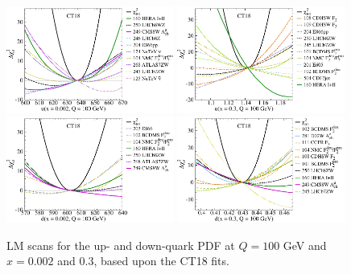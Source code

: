 \begin{figure}[p]
	\includegraphics[width=0.49\textwidth]{./fig/pib23hTnu2E-3p0_0E00_LM27-__1_x2_00E-03_Q1_00E+02_DEchi2_re0_ect.pdf} 
	\includegraphics[width=0.49\textwidth]{./fig/pib23hTnu3E-1p1_0E1_LM27-__1_x3_00E-01_Q1_00E+02_DEchi2_re0_ect.pdf}\\
	\includegraphics[width=0.49\textwidth]{./fig/LM/pib23hTnd2E-3p0_0E00_LM27-__2_x2_00E-03_Q1_00E+02_DEchi2_re0_ect.pdf}%
	\includegraphics[width=0.49\textwidth]{./fig/LM/pib23hTnd3E-1p0_0E00_LM27-__2_x3_00E-01_Q1_00E+02_DEchi2_re0_ect.pdf}\\ %
        	\caption{LM scans for the up- and down-quark PDF at $Q=100$ GeV and $x=0.002$ and $0.3$, based upon the CT18 fits.
		\label{fig:LMud}}
\end{figure}

